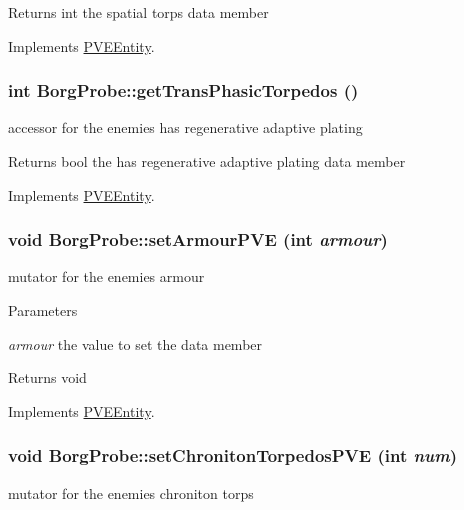 \begin{DoxyReturn}{Returns}
int the spatial torps data member 
\end{DoxyReturn}


Implements \hyperlink{classPVEEntity}{PVEEntity}.

\hypertarget{classBorgProbe_a1879936ef2e6dec0df73dc2628055be7}{
\subsubsection[{getTransPhasicTorpedos}]{\setlength{\rightskip}{0pt plus 5cm}int BorgProbe::getTransPhasicTorpedos ()}}
\label{db/deb/classBorgProbe_a1879936ef2e6dec0df73dc2628055be7}
accessor for the enemies has regenerative adaptive plating

\begin{DoxyReturn}{Returns}
bool the has regenerative adaptive plating data member 
\end{DoxyReturn}


Implements \hyperlink{classPVEEntity}{PVEEntity}.

\hypertarget{classBorgProbe_aa823f6c8ba0b31727124e104f2e9956b}{
\subsubsection[{setArmourPVE}]{\setlength{\rightskip}{0pt plus 5cm}void BorgProbe::setArmourPVE (int {\em armour})}}
\label{db/deb/classBorgProbe_aa823f6c8ba0b31727124e104f2e9956b}
mutator for the enemies armour


\begin{DoxyParams}{Parameters}
\item[{\em armour}]the value to set the data member\end{DoxyParams}
\begin{DoxyReturn}{Returns}
void 
\end{DoxyReturn}


Implements \hyperlink{classPVEEntity}{PVEEntity}.

\hypertarget{classBorgProbe_a8c289005635315de539283a12f96d03e}{
\subsubsection[{setChronitonTorpedosPVE}]{\setlength{\rightskip}{0pt plus 5cm}void BorgProbe::setChronitonTorpedosPVE (int {\em num})}}
\label{db/deb/classBorgProbe_a8c289005635315de539283a12f96d03e}
mutator for the enemies chroniton torps


